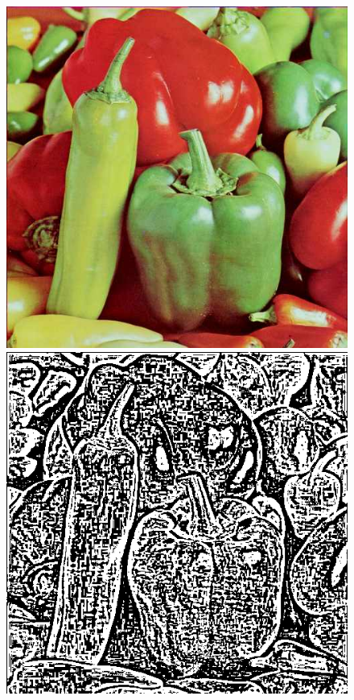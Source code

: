 \documentclass{article}
\begin{document}
\begin{figure}[!htb]
\centering
\includegraphics[scale=0.2]{img/peppers_24bit.png}
\includegraphics[scale=0.2]{img/Progowanie_Lokalne_peppers_24bit.png}\\

\end{figure}
\end{document}
